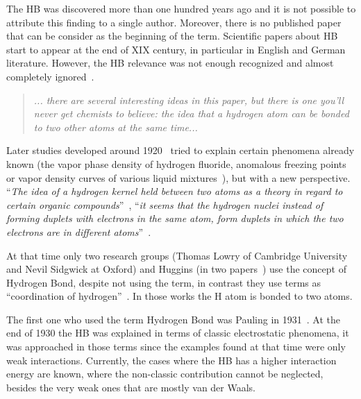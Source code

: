 The HB was discovered more than one hundred years ago and it is not possible to
attribute this finding to a single author. Moreover, there is no published
paper that can be consider as the beginning of the term. Scientific papers
about HB start to appear at the end of XIX century, in particular in English
and German literature. However, the HB relevance was not enough
recognized and almost completely ignored~\cite{steiner,quane1990reception}.


\color{blue}
\begin{quote}
\textit{... there are several interesting ideas in this paper, but there is one
you'll never get chemists to believe: the idea that a hydrogen atom can be
bonded to two other atoms at the same time...}
\begin{flushright}
\citet{hildebrand1958wendell}
\end{flushright}
\end{quote}
\color{black}

Later studies developed around 1920~\citep{steiner} tried to explain certain
phenomena already known (the vapor phase density of hydrogen
fluoride, anomalous freezing points or vapor density curves of various liquid
mixtures~\cite{quane1990reception}), but with a new perspective.  ``\textit{The
idea of a hydrogen kernel held between two atoms as a theory in regard to
certain organic compounds}''~\citep{Latimer1920}, ``\textit{it seems that the
hydrogen nuclei instead of forming duplets with electrons in the same atom,
form duplets in which the two electrons are in different
atoms}''~\citep{Langmuir1921}.

\newpage

At that time only two research groups (Thomas Lowry of Cambridge University and
Nevil Sidgwick at Oxford) and Huggins (in two papers~\citep{Huggins1922,
Huggins1922_2}) use the concept of Hydrogen Bond, despite not using the term,
in contrast they use terms as ``coordination of hydrogen''~\cite{Sidgwick1924}.
In those works the H atom is bonded to two atoms.

The first one who used the term Hydrogen Bond was
Pauling in 1931~\citep{gilli}.  At the end of 1930 the HB was explained in
terms of classic electrostatic phenomena, it was approached in those terms
since the examples found at that time were only weak interactions. Currently,
the cases where the HB has a higher interaction energy are known, where the
non-classic contribution cannot be neglected, besides the very weak ones that
are mostly van der Waals.

